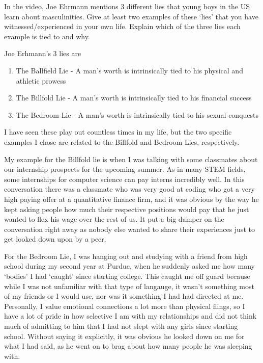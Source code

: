 \documentclass{article}
\begin{document}
\setcounter{section}{7}
\begin{prompt}
  In the video, Joe Ehrmann mentions 3 different lies that young boys in the US learn about masculinities. Give at least two examples of these `lies' that you have witnessed/experienced in your own life. Explain which of the three lies each example is tied to and why.
\end{prompt}
Joe Erhmann's 3 lies are \begin{enumerate}
  \item The Ballfield Lie - A man's worth is intrinsically tied to his physical and athletic prowess
  \item The Billfold Lie - A man's worth is intrinsically tied to his financial success
  \item The Bedroom Lie - A man's worth is intrinsically tied to his sexual conquests
\end{enumerate}
I have seen these play out countless times in my life, but the two specific examples I chose are related to the Billfold and Bedroom Lies, respectively.

My example for the Billfold lie is when I was talking with some classmates about our internship prospects for the upcoming summer.
As in many STEM fields, some internships for computer science can pay interns incredibly well.
In this conversation there was a classmate who was very good at coding who got a very high paying offer at a quantitative finance firm, and it was obvious by the way he kept asking people how much their respective positions would pay that he just wanted to flex his wage over the rest of us.
It put a big damper on the conversation right away as nobody else wanted to share their experiences just to get looked down upon by a peer.

For the Bedroom Lie, I was hanging out and studying with a friend from high school during my second year at Purdue, when he suddenly asked me how many `bodies' I had `caught' since starting college.
This caught me off guard because while I was not unfamiliar with that type of langauge, it wasn't something most of my friends or I would use, nor was it something I had had directed at me.
Personally, I value emotional connections a lot more than physical flings, so I have a lot of pride in how selective I am with my relationships and did not think much of admitting to him that I had not slept with any girls since starting school.
Without saying it explicitly, it was obvious he looked down on me for what I had said, as he went on to brag about how many people he was sleeping with.
\end{document}
